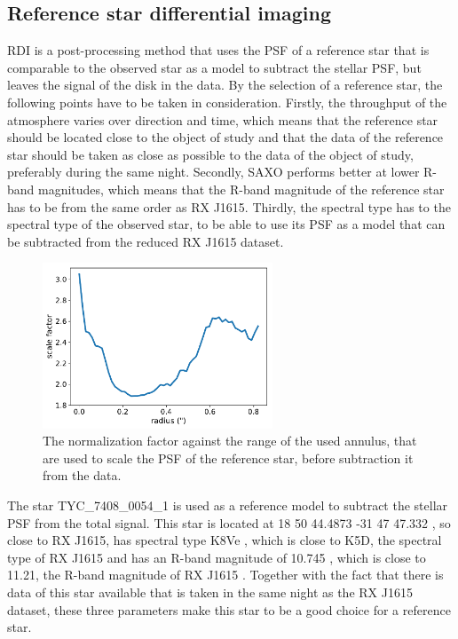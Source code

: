 \documentclass[twoside,single,12pt]{lion-msc}
\begin{document}
\subsection{Reference star differential imaging}
RDI is a post-processing method that uses the PSF of a reference star that is comparable to the observed star as a model to subtract the stellar PSF, but leaves the signal of the disk in the data. By the selection of a reference star, the following points have to be taken in consideration. Firstly, the throughput of the atmosphere varies over direction and time, which means that the reference star should be located close to the object of study and that the data of the reference star should be taken as close as possible to the data of the object of study, preferably during the same night. Secondly, SAXO performs better at lower R-band magnitudes, which means that the R-band magnitude of the reference star has to be from the same order as RX J1615. Thirdly, the spectral type has to the spectral type of the observed star, to be able to use its PSF as a model that can be subtracted from the reduced RX J1615 dataset. 
\bigskip

\begin{figure}
\centering
\vspace{-7mm}
\includegraphics[width = 0.61\textwidth]{normfac}
\caption{The normalization factor against the range of the used annulus, that are used to scale the PSF of the reference star, before subtraction it from the data.}
\label{fig:rdinorm}
\vspace{-5mm}
\end{figure}

\noindent
The star TYC\_7408\_0054\_1 is used as a reference model to subtract the stellar PSF from the total signal. This star is located at 18 50 44.4873 -31 47 47.332 \cite{Gaia2016}, so close to RX J1615, has spectral type K8Ve \cite{Torres2006}, which is close to K5D, the spectral type of RX J1615 \cite{Krautter1997} and has an R-band magnitude of 10.745 \cite{Gaia2016}, which is close to 11.21, the R-band magnitude of RX J1615 \cite{Makarov2007}. Together with the fact that there is data of this star available that is taken in the same night as the RX J1615 dataset, these three parameters make this star to be a good choice for a reference star.
\bigskip
\end{document}
